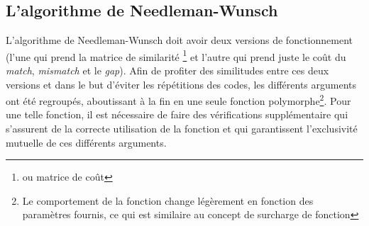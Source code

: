\documentclass[12pt]{article}
\begin{document}
\subsection{L'algorithme de Needleman-Wunsch}
\label{subsec:nw_impl} 
L'algorithme de Needleman-Wunsch doit avoir deux versions de fonctionnement (l'une qui prend la matrice de similarité \footnote{ou matrice de coût} et l'autre qui prend juste le coût du \textit{match}, \textit{mismatch} et le \textit{gap}). Afin de profiter des similitudes entre ces deux versions et dans le but d'éviter les répétitions des codes, les différents arguments ont été regroupés, aboutissant à la fin en une seule fonction polymorphe\footnote{Le comportement de la fonction change légèrement en fonction des paramètres fournis, ce qui est similaire au concept de surcharge de fonction}. Pour une telle fonction, il est nécessaire de faire des vérifications supplémentaire qui s’assurent de la correcte utilisation de la fonction et qui garantissent l’exclusivité mutuelle de ces différents arguments.
\end{document}
